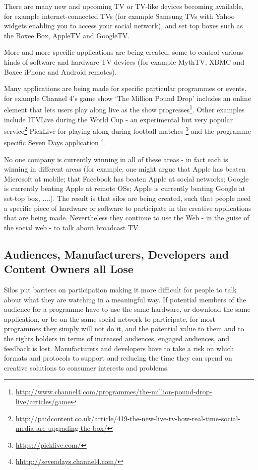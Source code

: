 \documentclass[]{article}%
\begin{document}
There are many new and upcoming TV or TV-like devices becoming available, for example internet-connected TVs (for example Samsung TVs with Yahoo widgets enabling you to access your social network), and set top boxes such as the Boxee Box, AppleTV and GoogleTV. 

More and more specific applications are being created, some to control various kinds of software and hardware TV devices (for example MythTV, XBMC and Boxee iPhone and Android remotes). 

Many applications are being made for specific particular programmes or events, for example Channel 4's game show `The Million Pound Drop' includes an online element that lets users play along live as the show progresses\footnote{\url{http://www.channel4.com/programmes/the-million-pound-drop-live/articles/game}}. Other examples include ITVLive during the World Cup - an experimental but very popular service\footnote{\url{http://paidcontent.co.uk/article/419-the-new-live-tv-how-real-time-social-media-are-upgrading-the-box/}} PickLive for playing along during football matches \footnote{\url{https://picklive.com/}} and the programme specific Seven Days application \footnote{\url{hhttp://sevendays.channel4.com/}}.

No one company is currently winning in all of these areas - in fact each is winning in different areas (for example, one might argue that Apple has beaten Microsoft at mobile; that Facebook has beaten Apple at social networks; Google is currently beating Apple at remote OSs; Apple is currently beating Google at set-top box, ....). The result is that silos are being created, such that people need a specific piece of hardware or software to participate in the creative applications that are being made. Nevertheless they continue to use the Web - in the guise of the social web - to talk about broadcast TV. 

\subsection{Audiences, Manufacturers, Developers and Content Owners all Lose}

Silos put barriers on participation making it more difficult for people to talk about what they are watching in a meaningful way. If potential members of the audience for a programme have to use the same hardware, or download the same application, or be on the same social network to participate, for most programmes they simply will not do it, and the potential value to them and to the rights holders in terms of  increased audiences, engaged audiences, and feedback is lost. Manufacturers and developers have to take a risk on which formats and protocols to support and reducing the time they can spend on creative solutions to consumer interests and problems. 
\end{document}
